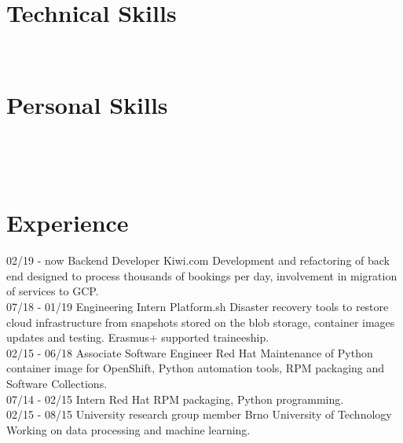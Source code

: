 \documentclass[]{friggeri-cv}
\begin{document}
\begin{aside}
  \section{Technical Skills}
    ~
  \section{Personal Skills}
    ~
\end{aside}
~
\section{Experience}
\begin{entrylist}
  \entry
    {02/19 - now}
    {Backend Developer}
    {Kiwi.com}
    {Development and refactoring of back end designed to process thousands of bookings per day,
    involvement in migration of services to GCP.\\}
  \entry
    {07/18 - 01/19}
    {Engineering Intern}
    {Platform.sh}
    {Disaster recovery tools to restore cloud infrastructure from snapshots stored on the blob storage,
    container images updates and testing. Erasmus+ supported traineeship.\\}
  \entry
    {02/15 - 06/18}
    {Associate Software Engineer}
    {Red Hat}
    {Maintenance of Python container image for OpenShift, Python automation tools, RPM packaging and
    Software Collections.\\}
  \entry
    {07/14 - 02/15}
    {Intern}
    {Red Hat}
    {RPM packaging, Python programming.\\}
  \entry
    {02/15 - 08/15}
    {University research group member}
    {Brno University of Technology}
    {Working on data processing and machine learning.\\}
\end{entrylist}
~
\end{document}
